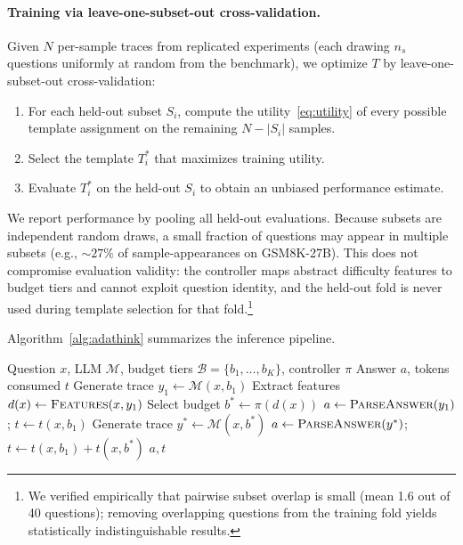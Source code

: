 \paragraph{Training via leave-one-subset-out cross-validation.}
Given $N$ per-sample traces from replicated experiments (each drawing $n_s$ questions uniformly at random from the benchmark), we optimize $T$ by leave-one-subset-out cross-validation:
\begin{enumerate}[nosep,leftmargin=*]
    \item For each held-out subset $S_i$, compute the utility~\eqref{eq:utility} of every possible template assignment on the remaining $N - |S_i|$ samples.
    \item Select the template $T_i^*$ that maximizes training utility.
    \item Evaluate $T_i^*$ on the held-out $S_i$ to obtain an unbiased performance estimate.
\end{enumerate}
We report performance by pooling all held-out evaluations.
Because subsets are independent random draws, a small fraction of questions may appear in multiple subsets (e.g., $\sim\!27\%$ of sample-appearances on GSM8K-27B).
This does not compromise evaluation validity: the controller maps abstract difficulty features to budget tiers and cannot exploit question identity, and the held-out fold is never used during template selection for that fold.\footnote{We verified empirically that pairwise subset overlap is small (mean 1.6 out of 40 questions); removing overlapping questions from the training fold yields statistically indistinguishable results.}

Algorithm~\ref{alg:adathink} summarizes the \adathink{} inference pipeline.

\begin{algorithm}[t]
\caption{\adathink{} Inference}
\label{alg:adathink}
\begin{algorithmic}[1]
\REQUIRE Question $x$, LLM $\mathcal{M}$, budget tiers $\mathcal{B} = \{b_1, \ldots, b_K\}$, controller $\pi$
\ENSURE Answer $a$, tokens consumed $t$
\STATE Generate trace $y_1 \leftarrow \mathcal{M}(x, b_1)$ \hfill {}
\STATE Extract features $d(x) \leftarrow \textsc{Features}(x, y_1)$
\STATE Select budget $b^* \leftarrow \pi(d(x))$ \hfill {}
    \STATE $a \leftarrow \textsc{ParseAnswer}(y_1)$; $t \leftarrow t(x, b_1)$
\ELSE
    \STATE Generate trace $y^* \leftarrow \mathcal{M}(x, b^*)$ \hfill {}
    \STATE $a \leftarrow \textsc{ParseAnswer}(y^*)$; $t \leftarrow t(x, b_1) + t(x, b^*)$ \hfill {}
\ENDIF
\RETURN $a, t$
\end{algorithmic}
\end{algorithm}

